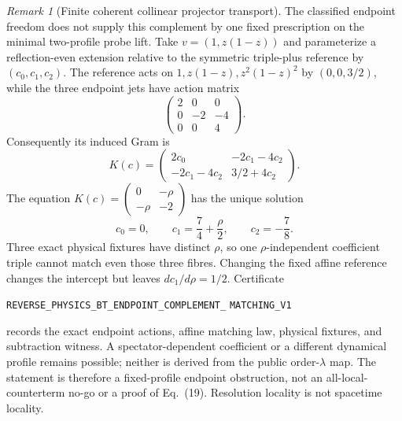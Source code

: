 \documentclass[11pt]{article}
\theoremstyle{definition}
\theoremstyle{remark}
\newtheorem{remark}[theorem]{Remark}
\begin{document}
\begin{remark}[Finite coherent collinear projector transport]
The classified endpoint freedom does not supply this complement by one fixed
prescription on the minimal two-profile probe lift.  Take
$v=(1,z(1-z))$ and parameterize a reflection-even extension relative to the
symmetric triple-plus reference by $(c_0,c_1,c_2)$.  The reference acts on
$1,z(1-z),z^2(1-z)^2$ by $(0,0,3/2)$, while the three endpoint jets have
action matrix
\[
 \begin{pmatrix}2&0&0\\0&-2&-4\\0&0&4\end{pmatrix}.
\]
Consequently its induced Gram is
\[
 K(c)=\begin{pmatrix}
 2c_0&-2c_1-4c_2\\
 -2c_1-4c_2&3/2+4c_2
 \end{pmatrix}.
\]
The equation
$K(c)=\left(\begin{smallmatrix}0&-\rho\\-\rho&-2\end{smallmatrix}\right)$
has the unique solution
\[
 c_0=0,\qquad c_1=\frac74+\frac\rho2,\qquad c_2=-\frac78.
\]
Three exact physical fixtures have distinct $\rho$, so one
$\rho$-independent coefficient triple cannot match even those three fibres.
Changing the fixed affine reference changes the intercept but leaves
$dc_1/d\rho=1/2$.  Certificate
\par\noindent
\texttt{REVERSE\_PHYSICS\_BT\_ENDPOINT\_COMPLEMENT\_}
\allowbreak\texttt{MATCHING\_V1}
\par\noindent
records the exact endpoint actions, affine matching law, physical fixtures,
and subtraction witness.  A spectator-dependent coefficient or a different
dynamical profile remains possible; neither is derived from the public
order-$\lambda$ map.  The statement is therefore a fixed-profile endpoint
obstruction, not an all-local-counterterm no-go or a proof of Eq.~(19).
Resolution locality is not spacetime locality.
\end{remark}
\end{document}

